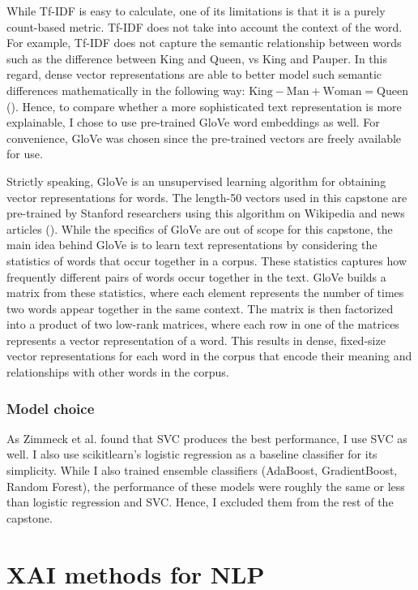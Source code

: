 While Tf-IDF is easy to calculate, one of its limitations is that it is a purely count-based metric. Tf-IDF does not take into account the context of the word. For example, Tf-IDF does not capture the semantic relationship between words such as the difference between King and Queen, vs King and Pauper. In this regard, dense vector representations are able to better model such semantic differences mathematically in the following way: $\text{King} - \text{Man} + \text{Woman} = \text{Queen}$ (\cite{vector_differences_2015}). Hence, to compare whether a more sophisticated text representation is more explainable, I chose to use pre-trained GloVe word embeddings as well. For convenience, GloVe was chosen since the pre-trained vectors are freely available for use.

Strictly speaking, GloVe is an unsupervised learning algorithm for obtaining vector representations for words. The length-50 vectors used in this capstone are pre-trained by Stanford researchers using this algorithm on Wikipedia and news articles (\cite{pennington2014glove}). While the specifics of GloVe are out of scope for this capstone, the main idea behind GloVe is to learn text representations by considering the statistics of words that occur together in a corpus. These statistics captures how frequently different pairs of words occur together in the text. GloVe builds a matrix from these statistics, where each element represents the number of times two words appear together in the same context. The matrix is then factorized into a product of two low-rank matrices, where each row in one of the matrices represents a vector representation of a word. This results in dense, fixed-size vector representations for each word in the corpus that encode their meaning and relationships with other words in the corpus.

\subsubsection{Model choice}
As Zimmeck et al. found that SVC produces the best performance, I use SVC as well. I also use scikitlearn's logistic regression as a baseline classifier for its simplicity. While I also trained ensemble classifiers (AdaBoost, GradientBoost, Random Forest), the performance of these models were roughly the same or less than logistic regression and SVC. Hence, I excluded them from the rest of the capstone.

\section{XAI methods for NLP}
